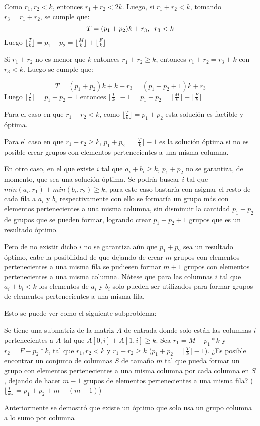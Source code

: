 \documentclass[article]{llncs}
\begin{document}
Como $r_1, r_2 < k$, entonces $r_1 + r_2 < 2k$. Luego, si $r_1 + r_2 < k$, tomando 
$r_3 = r_1 + r_2$, se cumple que:
$$T = (p_1 + p_2)k + r_3, \hspace{0,2 cm} r_3 < k$$
Luego $\lfloor \frac{T}{k}\rfloor = p_1 + p_2 = \lfloor \frac{M}{k}\rfloor  + \lfloor \frac{F}{k}\rfloor$

\vspace{0,2 cm}

Si $r_1 + r_2$ no es menor que $k$ entonces $r_1 + r_2 \geq k$, entonces $r_1 + r_2 = r_3 + k$
con $r_3 < k$. Luego se cumple que:

$$T = (p_1 + p_2)k + k + r_3 = (p_1 + p_2 + 1)k + r_3$$
Luego $\lfloor \frac{T}{k}\rfloor = p_1 + p_2 + 1$ entonces $\lfloor \frac{T}{k}\rfloor -1 = p_1 + p_2 = \lfloor \frac{M}{k}\rfloor  + \lfloor \frac{F}{k}\rfloor$

\vspace{0,2 cm}

Para el caso en que $r_1 + r_2 < k$, como $\lfloor \frac{T}{k}\rfloor = p_1 + p_2$ esta solución es factible 
y óptima.

Para el caso en que $r_1 + r_2 \geq k$, $p_1 + p_2 = \lfloor \frac{T}{k}\rfloor -1$ es 
la soluci\'on \'optima si no es posible crear grupos con elementos pertenecientes a una misma columna.

En otro caso, en el que existe $i$ tal que $a_i + b_i \geq k$, $p_1 + p_2$
no se garantiza, de momento, que sea una solución \'optima. Se podr\'ia 
buscar $i$ tal que $min(a_i, r_1) + min(b_i, r_2) \geq k$, para este caso 
bastar\'ia con asignar el resto de cada fila a $a_i$ y $b_i$ respectivamente
con ello se formar\'ia un grupo m\'as con elementos pertenecientes a una misma columna, 
sin disminuir la cantidad $p_1 + p_2$ de grupos que se pueden formar, logrando 
crear $p_1 + p_2 + 1$ grupos que es un resultado \'optimo.

Pero de no existir dicho $i$ no se garantiza a\'un que $p_1 + p_2$ sea 
un resultado \'optimo, cabe la posibilidad de que dejando de crear 
$m$ grupos con elementos pertenecientes a una misma fila se pudiesen 
formar $m+1$ grupos con elementos pertenecientes a una misma columna.
N\'otese que para las columnas $i$ tal que $a_i + b_i < k$ los elementos 
de $a_i$ y $b_i$ solo pueden ser utilizados para formar grupos de elementos
pertenecientes a una misma fila.

Esto se puede ver como el siguiente subproblema:

Se tiene una submatriz de la matriz $A$ de entrada donde solo est\'an 
las columnas $i$ pertenecientes a $A$ tal que $A[0, i] + A[1, i] \geq k$.
Sea $r_1 = M - p_1*k$ y $r_2 = F - p_2*k$, tal que $r_1, r_2 < k$ y 
$r_1 + r_2 \geq k$ ($p_1 + p_2 = \lfloor\frac{T}{k}\rfloor - 1$). ¿Es posible encontrar un conjunto de columnas $S$ de 
tamaño $m$ tal que pueda formar un grupo con elementos pertenecientes a 
una misma columna por cada columna en $S$, dejando de hacer $m-1$ grupos 
de elementos pertenecientes a una misma fila? ($\lfloor\frac{T}{k}\rfloor = p_1 + p_2 + m - (m-1)$)

Anteriormente se demostr\'o que existe un \'optimo que solo usa un grupo columna a lo sumo 
por columna
 
\end{document}
